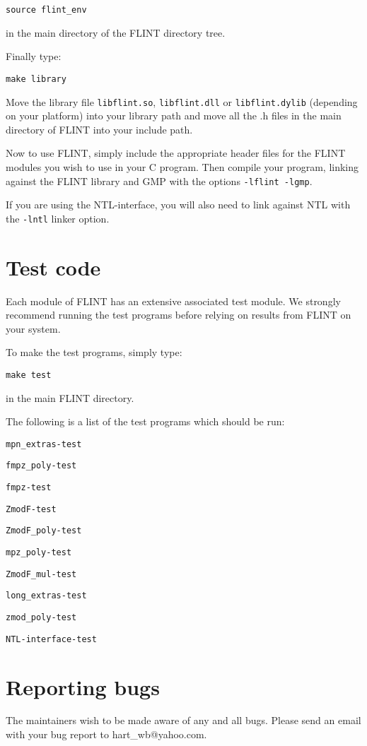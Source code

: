 \documentclass[a4paper,10pt]{article}
\newcommand{\code}{\lstinline}
\begin{document}
\code{source flint_env}

in the main directory of the FLINT directory tree. 

Finally type:

\code{make library}

Move the library file \code{libflint.so}, \code{libflint.dll} or \code{libflint.dylib} (depending on your platform) into your library path and move all the .h files in the main directory of FLINT into your include path.

Now to use FLINT, simply include the appropriate header files for the FLINT modules you wish to use in your C program. Then compile your program, linking against the FLINT library and GMP with the options \code{-lflint -lgmp}.

If you are using the NTL-interface, you will also need to link against NTL with the \code{-lntl} linker option.

\section{Test code}
Each module of FLINT has an extensive associated test module. We strongly recommend running the test programs before relying on results from FLINT on your system. 

To make the test programs, simply type:

\code{make test}

in the main FLINT directory.

The following is a list of the test programs which should be run:

\code{mpn_extras-test}

\code{fmpz_poly-test}

\code{fmpz-test}

\code{ZmodF-test}

\code{ZmodF_poly-test}

\code{mpz_poly-test}

\code{ZmodF_mul-test}

\code{long_extras-test}

\code{zmod_poly-test}

\code{NTL-interface-test}

\section{Reporting bugs}
The maintainers wish to be made aware of any and all bugs. Please send an email with your bug report to hart\_wb@yahoo.com.
\end{document}
